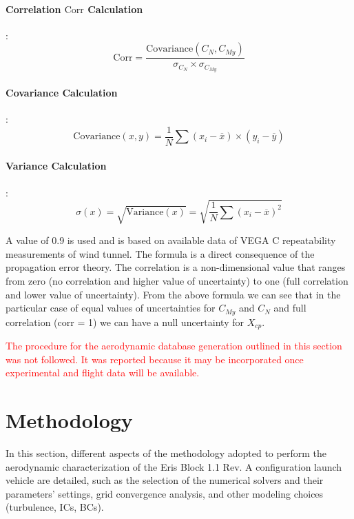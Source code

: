 \documentclass[12pt]{article}
\begin{document}
\paragraph{\textbf{Correlation} \( \text{Corr} \) \textbf{Calculation}}:
\begin{equation}
   \text{Corr} = \frac{\text{Covariance}(C_{N}, C_{My})}{\sigma_{C_N} \times \sigma_{C_{My}}}
\end{equation}

\paragraph{\textbf{Covariance Calculation}}:
\begin{equation}
   \text{Covariance}(x, y) = \frac{1}{N} \sum (x_i - \overline{x}) \times (y_i - \overline{y})
\end{equation}

\paragraph{\textbf{Variance Calculation}}:
\begin{equation}
    \sigma(x) = \sqrt{\text{Variance}(x)} = \sqrt{\frac{1}{N} \sum (x_i - \overline{x})^2}
\end{equation}

\noindent A value of 0.9 is used and is based on available data of VEGA C repeatability measurements of wind tunnel. The formula is a direct consequence of the propagation error theory. The correlation is a non-dimensional value that ranges from zero (no correlation and higher value of uncertainty) to one (full correlation and lower value of uncertainty). From the above formula we can see that in the particular case of equal values of uncertainties for $C_{My}$ and $C_N$ and full correlation (corr = 1) we can have a null uncertainty for $X_{cp}$.

\textcolor{red}{The procedure for the aerodynamic database generation outlined in this section was not followed. It was reported because it may be incorporated once experimental and flight data will be available.}

\section{Methodology}\label{sec:method}
In this section, different aspects of the methodology adopted to perform the aerodynamic characterization of the Eris Block 1.1 Rev. A configuration launch vehicle are detailed, such as the selection of the numerical solvers and their parameters' settings, grid convergence analysis, and other modeling choices (turbulence, ICs, BCs).
\end{document}
